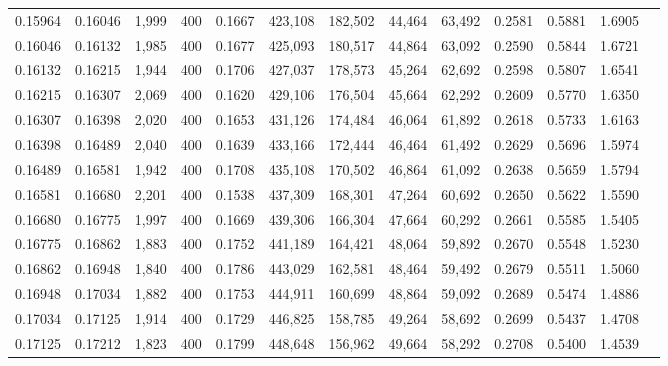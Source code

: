 \begin{tabular}{rrrrrrrrrrrrr}
0.15964 & 0.16046 &  1,999 & 400 &                                     0.1667 & 423,108 & 182,502 &  44,464 &  63,492 & 0.2581 & 0.5881 & 1.6905 \\
0.16046 & 0.16132 &  1,985 & 400 &                                     0.1677 & 425,093 & 180,517 &  44,864 &  63,092 & 0.2590 & 0.5844 & 1.6721 \\
0.16132 & 0.16215 &  1,944 & 400 &                                     0.1706 & 427,037 & 178,573 &  45,264 &  62,692 & 0.2598 & 0.5807 & 1.6541 \\
0.16215 & 0.16307 &  2,069 & 400 &                                     0.1620 & 429,106 & 176,504 &  45,664 &  62,292 & 0.2609 & 0.5770 & 1.6350 \\
0.16307 & 0.16398 &  2,020 & 400 &                                     0.1653 & 431,126 & 174,484 &  46,064 &  61,892 & 0.2618 & 0.5733 & 1.6163 \\
0.16398 & 0.16489 &  2,040 & 400 &                                     0.1639 & 433,166 & 172,444 &  46,464 &  61,492 & 0.2629 & 0.5696 & 1.5974 \\
0.16489 & 0.16581 &  1,942 & 400 &                                     0.1708 & 435,108 & 170,502 &  46,864 &  61,092 & 0.2638 & 0.5659 & 1.5794 \\
0.16581 & 0.16680 &  2,201 & 400 &                                     0.1538 & 437,309 & 168,301 &  47,264 &  60,692 & 0.2650 & 0.5622 & 1.5590 \\
0.16680 & 0.16775 &  1,997 & 400 &                                     0.1669 & 439,306 & 166,304 &  47,664 &  60,292 & 0.2661 & 0.5585 & 1.5405 \\
0.16775 & 0.16862 &  1,883 & 400 &                                     0.1752 & 441,189 & 164,421 &  48,064 &  59,892 & 0.2670 & 0.5548 & 1.5230 \\
0.16862 & 0.16948 &  1,840 & 400 &                                     0.1786 & 443,029 & 162,581 &  48,464 &  59,492 & 0.2679 & 0.5511 & 1.5060 \\
0.16948 & 0.17034 &  1,882 & 400 &                                     0.1753 & 444,911 & 160,699 &  48,864 &  59,092 & 0.2689 & 0.5474 & 1.4886 \\
0.17034 & 0.17125 &  1,914 & 400 &                                     0.1729 & 446,825 & 158,785 &  49,264 &  58,692 & 0.2699 & 0.5437 & 1.4708 \\
0.17125 & 0.17212 &  1,823 & 400 &                                     0.1799 & 448,648 & 156,962 &  49,664 &  58,292 & 0.2708 & 0.5400 & 1.4539 \\

\end{tabular}
